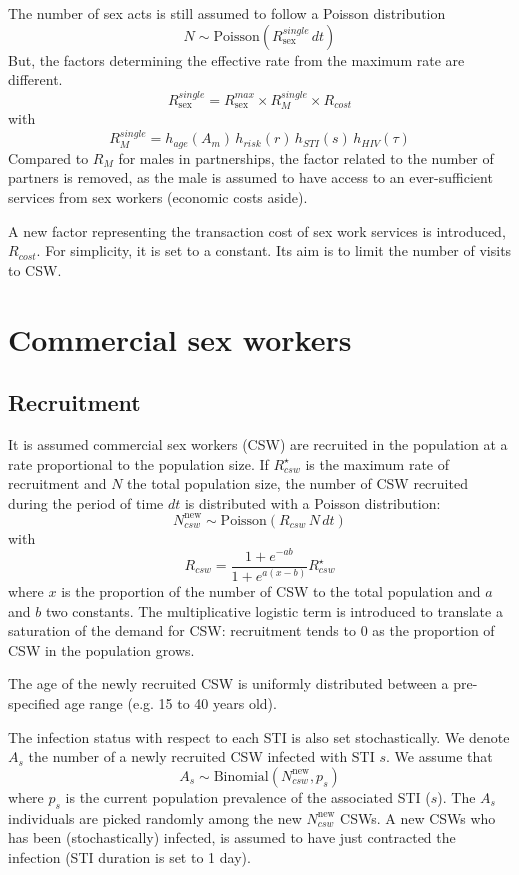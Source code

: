 \documentclass[11pt, onecolumn]{article}
\begin{document}
The number of sex acts is still assumed to follow a Poisson distribution
$$N\sim \mathrm{Poisson}(R_{\mathrm{sex}}^{single}\, dt)$$
But, the factors determining the effective rate from the maximum rate are different.
$$R_{\mathrm{sex}}^{single} = R_{\mathrm{sex}}^{max} \times R_{M}^{single} \times R_{cost} $$
with 
$$R_M^{single}= h_{age}(A_m)  \, h_{risk}(r) \,h_{STI}(s) \,h_{HIV}(\tau)  $$
Compared to $R_M$ for males in partnerships, the factor related to the number of partners is removed, as the male is assumed to have access to an ever-sufficient services from sex workers (economic costs aside).

A new factor representing the transaction cost of sex work services is introduced, $R_{cost}$. For simplicity, it is set to a constant. Its aim is to limit the number of visits to CSW.




\section{Commercial sex workers}

\subsection{Recruitment}

It is assumed commercial sex workers (CSW) are recruited in the population at a rate proportional to the population size. If $R_{csw}^{\star}$ is the maximum rate of recruitment and $N$ the total population size, the number of CSW recruited during the period of time $dt$ is distributed with a Poisson distribution:
$$N_{csw}^{\mathrm{new}} \sim \text{Poisson}\left(R_{csw}\,N\,dt\right)$$
with 
$$ R_{csw} = \frac{1+e^{-ab}}{1+e^{a(x-b)}}R_{csw}^{\star}$$
where $x$ is the proportion of the number of CSW to the total population and $a$ and $b$ two constants. The multiplicative logistic term is introduced to translate a saturation of the demand for CSW: recruitment tends to 0 as the proportion of CSW in the population grows.

The age of the newly recruited CSW is uniformly distributed between a pre-specified age range (e.g. 15 to 40 years old).

The infection status with respect to each STI is also set stochastically. We denote $A_s$ the number of a newly recruited CSW infected with STI $s$. We assume that
$$A_s \sim \text{Binomial}(N_{csw}^{\mathrm{new}},p_s)$$
where $p_s$ is the current population prevalence of the associated STI ($s$). The $A_s$ individuals are picked randomly among the new $N_{csw}^{\mathrm{new}}$ CSWs.
A new CSWs who has been (stochastically) infected, is assumed to have just contracted the infection (STI duration is set to 1 day).
\end{document}

